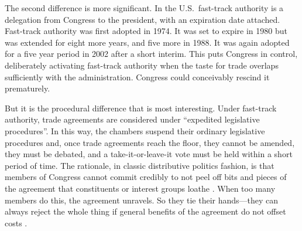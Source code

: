 \documentclass[letter,12pt]{article}
\begin{document}
The second difference is more significant. In the U.S.\, fast-track authority is a delegation from Congress to the president, with an expiration date attached. Fast-track authority was first adopted in 1974. It was set to expire in 1980 but was extended for eight more years, and five more in 1988. It was again adopted for a five year period in 2002 after a short interim. This puts Congress in control, deliberately activating fast-track authority when the taste for trade overlaps sufficiently with the administration. Congress could conceivably rescind it prematurely.

But it is the procedural difference that is most interesting. Under fast-track authority, trade agreements are considered under ``expedited legislative procedures''. In this way, the chambers suspend their ordinary legislative procedures and, once trade agreements reach the floor, they cannot be amended, they must be debated, and a take-it-or-leave-it vote must be held within a short period of time. The rationale, in classic distributive politics fashion, is that members of Congress cannot commit credibly to not peel off bits and pieces of the agreement that constituents or interest groups loathe \citep{mcnollgast.1987}. When too many members do this, the agreement unravels. So they tie their hands---they can always reject the whole thing if general benefits of the agreement do not offset costs \citep{destler-1992,destler-1991,margolis-1986,haggard-1988,goldstein-1988,lohmann-ohalloran.1994}.

\end{document}
